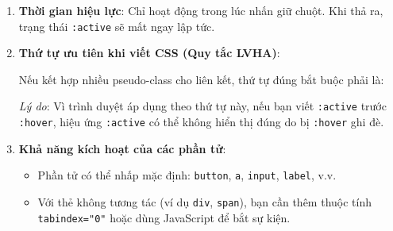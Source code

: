 \documentclass[11pt,oneside]{book}
\newcommand{\codeinline}[1]{\textcolor{accentOrange}{\texttt{#1}}}
\begin{document}
\begin{warnBox}
\begin{enumerate}[leftmargin=1.5em, itemsep=3pt, parsep=0pt]
    \item \textbf{Thời gian hiệu lực}: Chỉ hoạt động trong lúc nhấn giữ chuột. Khi thả ra, trạng thái \codeinline{:active} sẽ mất ngay lập tức.
    \item \textbf{Thứ tự ưu tiên khi viết CSS (Quy tắc LVHA)}:
    \par\vspace{2pt}
    Nếu kết hợp nhiều pseudo-class cho liên kết, thứ tự đúng bắt buộc phải là:
    \par\vspace{3pt}
    \par\vspace{3pt}
    \textit{Lý do}: Vì trình duyệt áp dụng theo thứ tự này, nếu bạn viết \codeinline{:active} trước \codeinline{:hover}, hiệu ứng \codeinline{:active} có thể không hiển thị đúng do bị \codeinline{:hover} ghi đè.
    \item \textbf{Khả năng kích hoạt của các phần tử}:
    \begin{itemize}[leftmargin=1.2em, itemsep=2pt]
        \item Phần tử có thể nhấp mặc định: \codeinline{button}, \codeinline{a}, \codeinline{input}, \codeinline{label}, v.v.
        \item Với thẻ không tương tác (ví dụ \codeinline{div}, \codeinline{span}), bạn cần thêm thuộc tính \codeinline{tabindex="0"} hoặc dùng JavaScript để bắt sự kiện.
    \end{itemize}
\end{enumerate}
\end{warnBox}
\end{document}
